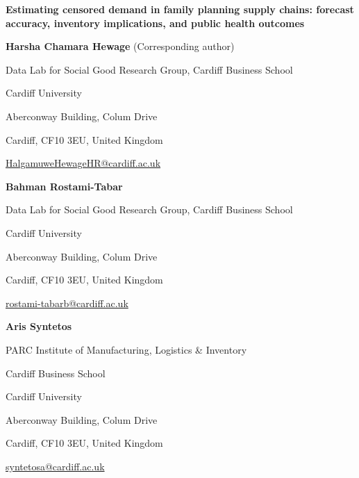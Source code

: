 \begingroup
\thispagestyle{plain}
\singlespacing
\setlength{\parindent}{0pt}
\setlength{\parskip}{0pt}
{\centering\Large\bfseries Estimating censored demand in family planning supply chains: forecast accuracy, inventory implications, and public health outcomes\par}
\vspace{1.5em}

\noindent\begin{minipage}{\linewidth}
\textbf{Harsha Chamara Hewage} (Corresponding author)\par
Data Lab for Social Good Research Group, Cardiff Business School\par
Cardiff University\par
Aberconway Building, Colum Drive\par
Cardiff, CF10 3EU, United Kingdom\par
\href{mailto:HalgamuweHewageHR@cardiff.ac.uk}{HalgamuweHewageHR@cardiff.ac.uk}\par
\end{minipage}\par\vspace{1em}

\noindent\begin{minipage}{\linewidth}
\textbf{Bahman Rostami-Tabar}\par
Data Lab for Social Good Research Group, Cardiff Business School\par
Cardiff University\par
Aberconway Building, Colum Drive\par
Cardiff, CF10 3EU, United Kingdom\par
\href{mailto:rostami-tabarb@cardiff.ac.uk}{rostami-tabarb@cardiff.ac.uk}\par
\end{minipage}\par\vspace{1em}

\noindent\begin{minipage}{\linewidth}
\textbf{Aris Syntetos}\par
PARC Institute of Manufacturing, Logistics \& Inventory\par
Cardiff Business School\par
Cardiff University\par
Aberconway Building, Colum Drive\par
Cardiff, CF10 3EU, United Kingdom\par
\href{mailto:syntetosa@cardiff.ac.uk}{syntetosa@cardiff.ac.uk}\par
\end{minipage}\par\vspace{1em}

